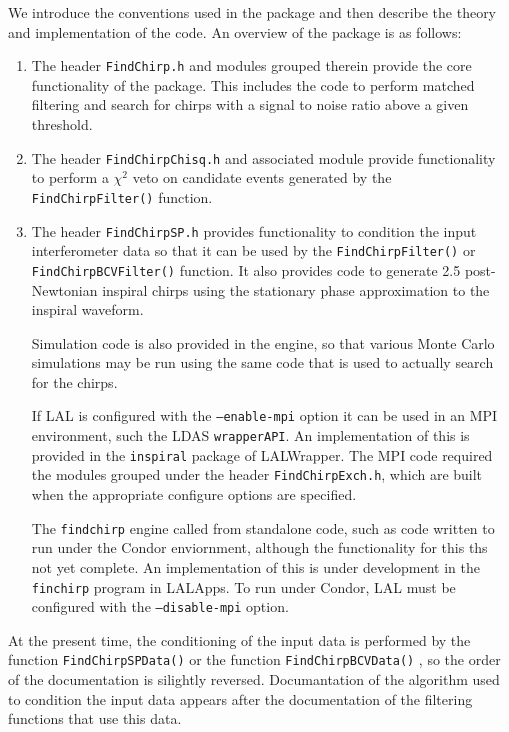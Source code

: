 We introduce the conventions used in the package and then describe the theory
and implementation of the code. An overview of the package is as follows:
\begin{enumerate}
\item The header \texttt{FindChirp.h} and modules grouped therein provide the
core functionality of the package. This includes the code to perform matched
filtering and search for chirps with a signal to noise ratio above a given
threshold.

\item The header \texttt{FindChirpChisq.h} and associated module provide
functionality to perform a $\chi^2$ veto on candidate events generated by the
\texttt{FindChirpFilter()} function.

\item The header \texttt{FindChirpSP.h} provides functionality to condition
the input interferometer data so that it can be used by the 
\texttt{FindChirpFilter()}
or \texttt{FindChirpBCVFilter()} function. 
It also provides code to generate 2.5
post-Newtonian inspiral chirps using the stationary phase approximation to the
inspiral waveform.

Simulation code is also provided in the engine, so that various Monte Carlo
simulations may be run using the same code that is used to actually search for
the chirps.

If LAL is configured with the \texttt{--enable-mpi} option it can
be used in an MPI environment, such the LDAS \texttt{wrapperAPI}. An
implementation of this is provided in the \texttt{inspiral} package of
LALWrapper. The MPI code required the modules grouped under the header
\texttt{FindChirpExch.h}, which are built when the appropriate configure
options are specified.

The \texttt{findchirp} engine called from standalone code, such as code
written to run under the Condor enviornment, although the functionality for
this ths not yet complete. An implementation of this is under development in
the \texttt{finchirp} program in LALApps. To run under Condor, LAL must be
configured with the \texttt{--disable-mpi} option.

\end{enumerate}

At the present time, the conditioning of the input data is performed by the
function \texttt{FindChirpSPData()} or the function \texttt{FindChirpBCVData()}
, so the order of the documentation is
silightly reversed. Documantation of the algorithm used to condition the input
data appears after the documentation of the filtering functions that use this
data.

